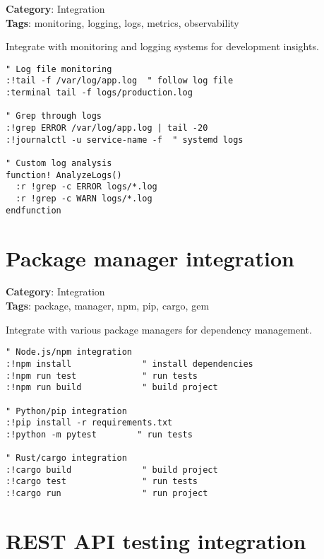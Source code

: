 {{{{{{\textbf{Category}: Integration\\ \textbf{Tags}: monitoring, logging, logs, metrics, observability
\vspace{0.5cm}

Integrate with monitoring and logging systems for development insights.

\begin{Exa*}{}
\begin{Verbatim}[fontsize=\footnotesize, breaklines, breakanywhere]
" Log file monitoring
:!tail -f /var/log/app.log  " follow log file
:terminal tail -f logs/production.log

" Grep through logs
:!grep ERROR /var/log/app.log | tail -20
:!journalctl -u service-name -f  " systemd logs

" Custom log analysis
function! AnalyzeLogs()
  :r !grep -c ERROR logs/*.log
  :r !grep -c WARN logs/*.log
endfunction
\end{Verbatim}
\end{Exa*}

\section{Package manager integration}

\textbf{Category}: Integration\\ \textbf{Tags}: package, manager, npm, pip, cargo, gem
\vspace{0.5cm}

Integrate with various package managers for dependency management.

\begin{Exa*}{}
\begin{Verbatim}[fontsize=\footnotesize, breaklines, breakanywhere]
" Node.js/npm integration
:!npm install              " install dependencies
:!npm run test             " run tests
:!npm run build            " build project

" Python/pip integration
:!pip install -r requirements.txt
:!python -m pytest        " run tests

" Rust/cargo integration
:!cargo build              " build project
:!cargo test               " run tests
:!cargo run                " run project
\end{Verbatim}
\end{Exa*}

\section{REST API testing integration}

}}}}}}
